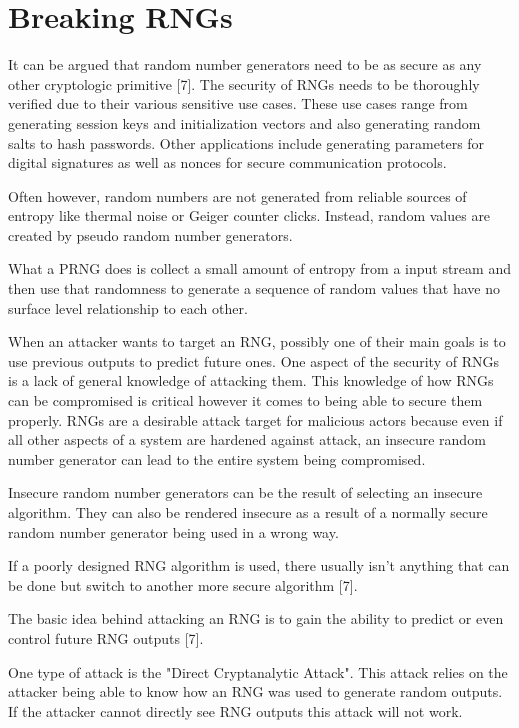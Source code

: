\documentclass{article}
\begin{document}
    \section{Breaking RNGs}

    It can be argued that random number generators need to be as secure
    as any other cryptologic primitive [7].
    The security of RNGs needs to be thoroughly verified due to their
    various sensitive use cases.
    These use cases range from generating session keys and initialization vectors and
    also generating random salts to hash passwords.
    Other applications include generating parameters for digital signatures
    as well as nonces for secure communication protocols.

    Often however, random numbers are not generated from reliable sources
    of entropy like thermal noise or Geiger counter clicks.
    Instead, random values are created by pseudo random number generators.

    What a PRNG does is collect a small amount of entropy from a input stream
    and then use that randomness to generate a sequence of random values that
    have no surface level relationship to each other.

    When an attacker wants to target an RNG, possibly one of their main goals
    is to use previous outputs to predict future ones.
    One aspect of the security of RNGs is a lack of general knowledge of
    attacking them. This knowledge of how RNGs can be compromised is critical however
    it comes to being able to secure them properly.
    RNGs are a desirable attack target for malicious actors because even if all
    other aspects of a system are hardened against attack, an insecure random
    number generator can lead to the entire system being compromised.

    Insecure random number generators can be the result of selecting an insecure algorithm.
    They can also be rendered insecure as a result of a normally secure random number
    generator being used in a wrong way.

    If a poorly designed RNG algorithm is used, there usually isn't anything that
    can be done but switch to another more secure algorithm [7].

    The basic idea behind attacking an RNG is to gain the ability to predict
    or even control future RNG outputs [7].

    One type of attack is the "Direct Cryptanalytic Attack". This attack
    relies on the attacker being able to know how an RNG was used to generate
    random outputs.
    If the attacker cannot directly see RNG outputs this attack will not work.
\end{document}
